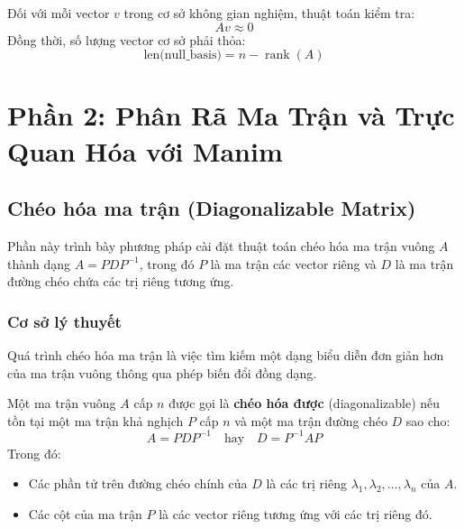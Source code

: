 \documentclass[12pt,a4paper]{article}
\begin{document}
\begin{infobox}
Đối với mỗi vector $v$ trong cơ sở không gian nghiệm, thuật toán kiểm tra:
\begin{equation}
A v \approx 0
\end{equation}
Đồng thời, số lượng vector cơ sở phải thỏa: 
\begin{equation}
\text{len(null\_basis)} = n - \operatorname{rank}(A)
\end{equation}
\end{infobox}

\newpage


\section{Phần 2: Phân Rã Ma Trận và Trực Quan Hóa với Manim}

\subsection{Chéo hóa ma trận (Diagonalizable Matrix)}

Phần này trình bày phương pháp cài đặt thuật toán chéo hóa ma trận vuông $A$ thành dạng $A = PDP^{-1}$, trong đó $P$ là ma trận các vector riêng và $D$ là ma trận đường chéo chứa các trị riêng tương ứng.

\subsubsection{Cơ sở lý thuyết}

Quá trình chéo hóa ma trận là việc tìm kiếm một dạng biểu diễn đơn giản hơn của ma trận vuông thông qua phép biến đổi đồng dạng.

\begin{infobox}
    Một ma trận vuông $A$ cấp $n$ được gọi là \textbf{chéo hóa được} (diagonalizable) nếu tồn tại một ma trận khả nghịch $P$ cấp $n$ và một ma trận đường chéo $D$ sao cho:
    \begin{equation}
        A = PDP^{-1} \quad \text{hay} \quad D = P^{-1}AP
    \end{equation}
    Trong đó:
    \begin{itemize}
        \item Các phần tử trên đường chéo chính của $D$ là các trị riêng $\lambda_1, \lambda_2, \dots, \lambda_n$ của $A$.
        \item Các cột của ma trận $P$ là các vector riêng tương ứng với các trị riêng đó.
    \end{itemize}
\end{infobox}
\end{document}

